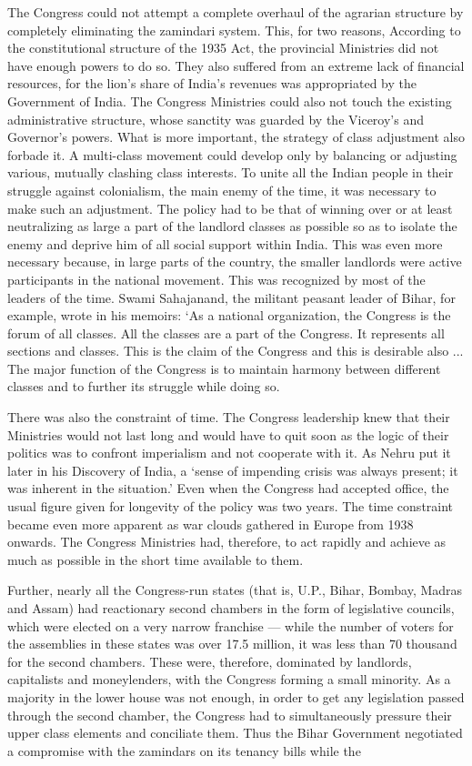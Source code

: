 The Congress could not attempt a complete overhaul of the agrarian structure by completely eliminating the zamindari system. This, for two reasons, According to the constitutional structure of the 1935 Act, the provincial Ministries did not have enough powers to do so. They also suffered from an extreme lack of financial resources, for the lion's share of India's revenues was appropriated by the Government of India. The Congress Ministries could also not touch the existing administrative structure, whose sanctity was guarded by the Viceroy's and Governor's powers. What is more important, the strategy of class adjustment also forbade it. A multi-class movement could develop only by balancing or adjusting various, mutually clashing class interests. To unite all the Indian people in their struggle against colonialism, the main enemy of the time, it was necessary to make such an adjustment. The policy had to be that of winning over or at least neutralizing as large a part of the landlord classes as possible so as to isolate the enemy and deprive him of all social support within India. This was even more necessary because, in large parts of the country, the smaller landlords were active participants in the national movement. This was recognized by most of the leaders of the time. Swami Sahajanand, the militant peasant leader of Bihar, for example, wrote in his memoirs: `As a national organization, the Congress is the forum of all classes. All the classes are a part of the Congress. It represents all sections and classes. This is the claim of the Congress and this is desirable also ... The major function of the Congress is to maintain harmony between different classes and to further its struggle while doing so. 

There was also the constraint of time. The Congress leadership knew that their Ministries would not last long and would have to quit soon as the logic of their politics was to confront imperialism and not cooperate with it. As Nehru put it later in his Discovery of India, a `sense of impending crisis was always present; it was inherent in the situation.' Even when the Congress had accepted office, the usual figure given for longevity of the policy was two years. The time constraint became even more apparent as war clouds gathered in Europe from 1938 onwards. The Congress Ministries had, therefore, to act rapidly and achieve as much as possible in the short time available to them. 

Further, nearly all the Congress-run states (that is, U.P., Bihar, Bombay, Madras and Assam) had reactionary second chambers in the form of legislative councils, which were elected on a very narrow franchise --- while the number of voters for the assemblies in these states was over 17.5 million, it was less than 70 thousand for the second chambers. These were, therefore, dominated by landlords, capitalists and moneylenders, with the Congress forming a small minority. As a majority in the lower house was not enough, in order to get any legislation passed through the second chamber, the Congress had to simultaneously pressure their upper class elements and conciliate them. Thus the Bihar Government negotiated a compromise with the zamindars on its tenancy bills while the 

